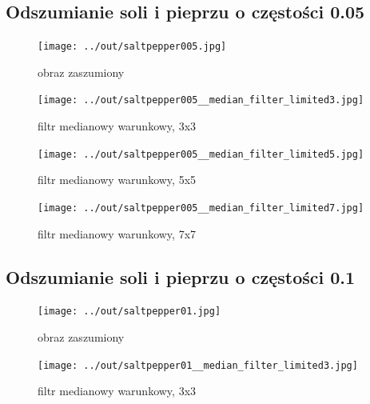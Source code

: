 \documentclass[a4paper,12pt]{article}
\begin{document}



\newpage
\subsection{Odszumianie soli i pieprzu o częstości 0.05}
\begin{figure}[h!]
\begin{minipage}[t]{7.5cm}
\begin{center}
\texttt{[image: ../out/saltpepper005.jpg]}
\caption{obraz zaszumiony}
\end{center}
\end{minipage}
\hfill
\begin{minipage}[t]{7.5cm}
\begin{center}
\texttt{[image: ../out/saltpepper005\_\_median\_filter\_limited3.jpg]}
\caption{filtr medianowy warunkowy, 3x3}
\end{center}
\end{minipage}
\end{figure}

\begin{figure}[h!]
\begin{minipage}[t]{7.5cm}
\begin{center}
\texttt{[image: ../out/saltpepper005\_\_median\_filter\_limited5.jpg]}
\caption{filtr medianowy warunkowy, 5x5}
\end{center}
\end{minipage}
\hfill
\begin{minipage}[t]{7.5cm}
\begin{center}
\texttt{[image: ../out/saltpepper005\_\_median\_filter\_limited7.jpg]}
\caption{filtr medianowy warunkowy, 7x7}
\end{center}
\end{minipage}
\end{figure}


\newpage
\subsection{Odszumianie soli i pieprzu o częstości 0.1}
\begin{figure}[h!]
\begin{minipage}[t]{7.5cm}
\begin{center}
\texttt{[image: ../out/saltpepper01.jpg]}
\caption{obraz zaszumiony}
\end{center}
\end{minipage}
\hfill
\begin{minipage}[t]{7.5cm}
\begin{center}
\texttt{[image: ../out/saltpepper01\_\_median\_filter\_limited3.jpg]}
\caption{filtr medianowy warunkowy, 3x3}
\end{center}
\end{minipage}
\end{figure}
\end{document}
